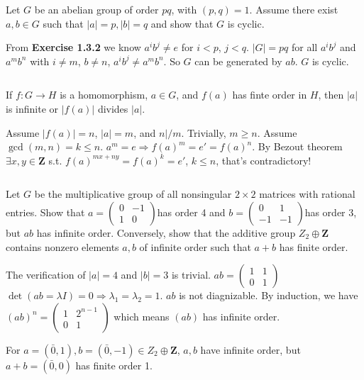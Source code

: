 $$ $$

\begin{ex}
    Let $G$ be an abelian group of order $pq$, with $(p,q)=1$. Assume there exist $a,b\in G$ such that $\left| a \right| =p, \left| b \right| =q$ and show that $G$ is cyclic.
\end{ex}

\begin{answer}
    From \textbf{Exercise 1.3.2} we know $a^{i}b^{j}\neq e$ for $i<p$, $j<q$. $\left| G \right| =pq$ for all $a^{i}b^{j}$ and $a^{m}b^{n}$ with $i\neq m$, $b\neq n$, $a^{i}b^{j}\neq a^{m}b^{n}$. So $G$ can be generated by $ab$. $G$ is cyclic.
\end{answer}

$$ $$

\begin{ex}
    If $f:G\to H$ is a homomorphism, $a\in G$, and $f(a)$ has finte order in $H$, then $\left| a \right| $ is infinite or $\left| f(a) \right| $ divides $\left| a \right| $.
\end{ex}

\begin{answer}
    Assume $\left| f(a) \right| =n$, $\left| a \right| =m$, and $n|\!\!/m$. Trivially, $m\geq n$. Assume $\gcd(m,n)=k\leq n$. $a^{m}=e\Rightarrow f(a)^{m}=e'=f(a)^{n}$. By Bezout theorem $\exists x,y\in \mathbf{Z}$ s.t. $f(a)^{mx+ny}=f(a)^{k}=e'$, $k\leq n$, that's contradictory!
\end{answer}

$$ $$

\begin{ex}
    Let $G$ be the multiplicative group of all nonsingular $2\times 2$ matrices with rational entries. Show that $a=\begin{pmatrix}
        0 & -1\\1 & 0
    \end{pmatrix}$has order 4 and $b=\begin{pmatrix}
        0& 1\\-1&-1
    \end{pmatrix}$has order 3, but $ab$ has infinite order. Conversely, show that the additive group $Z_{2}\oplus \mathbf{Z}$ contains nonzero elements $a,b$ of infinite order such that $a+b$ has finite order. 
\end{ex}

\begin{answer}
    The verification of $\left| a \right| =4$ and $\left| b \right| =3$ is trivial. $ab=\begin{pmatrix}
        1 & 1\\ 0& 1
    \end{pmatrix}$ $\det(ab=\lambda I)=0\Rightarrow \lambda_{1}=\lambda_{2}=1$. $ab$ is not diagnizable. By induction, we have $(ab)^{n}=\begin{pmatrix}
        1 & 2^{n-1}\\ 0& 1
    \end{pmatrix}$ which means $(ab)$ has infinite order.

    For $a=(\bar{0},1), b=(\bar{0},-1)\in Z_{2}\oplus\mathbf{Z}$, $a,b$ have infinite order, but $a+b=(\bar{0},0)$ has finite order 1.
\end{answer}

